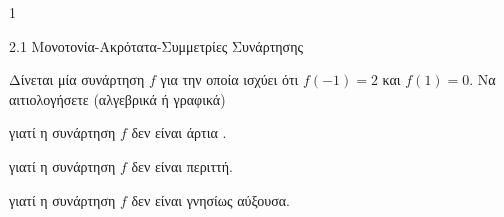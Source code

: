 \begin{ylh}{1}
\item 2.1 Μονοτονία-Ακρότατα-Συμμετρίες Συνάρτησης
\end{ylh}
Δίνεται μία συνάρτηση $f$ για την οποία ισχύει ότι $f(-1) = 2$ και $f(1) = 0$.
Να αιτιολογήσετε (αλγεβρικά ή γραφικά)
\begin{alist}
\item γιατί η συνάρτηση $f$ δεν είναι άρτια .
\item γιατί η συνάρτηση $f$ δεν είναι περιττή.
\item γιατί η συνάρτηση $f$ δεν είναι γνησίως αύξουσα.
\end{alist}

